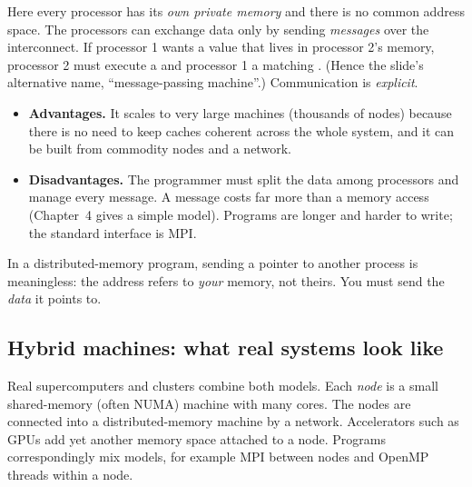 \begin{center}
\end{center}

Here every processor has its \emph{own private memory} and there is no common address space. The processors can
exchange data only by sending \emph{messages} over the interconnect. If processor 1 wants a value that lives in
processor 2's memory, processor 2 must execute a  and processor 1 a matching . (Hence
the slide's alternative name, ``message-passing machine''.) Communication is \emph{explicit}.

\begin{itemize}
  \item \textbf{Advantages.} It scales to very large machines (thousands of nodes) because there is no need
        to keep caches coherent across the whole system, and it can be built from commodity nodes and a network.
  \item \textbf{Disadvantages.} The programmer must split the data among processors and manage every message.
        A message costs far more than a memory access (Chapter~4 gives a simple model). Programs are longer and
        harder to write; the standard interface is MPI.
\end{itemize}

\begin{pitfall}
In a distributed-memory program, sending a pointer to another process is meaningless: the address refers to
\emph{your} memory, not theirs. You must send the \emph{data} it points to.
\end{pitfall}

\subsection{Hybrid machines: what real systems look like}

Real supercomputers and clusters combine both models. Each \emph{node} is a small shared-memory (often NUMA) machine with many cores. The nodes are
connected into a distributed-memory machine by a network. Accelerators such as GPUs add yet another memory space
attached to a node. Programs correspondingly mix models, for example MPI between nodes and OpenMP threads within a node.

